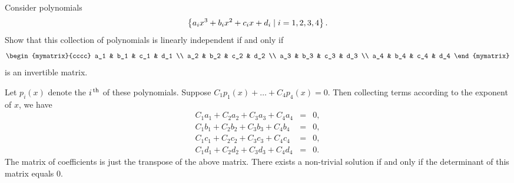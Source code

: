 \begin{ex}
  Consider polynomials
  \begin{equation*}
    \left\{a_ix^3+b_ix^2+c_ix+d_i \mid i=1,2,3,4\right\}.
  \end{equation*}
  Show that this collection of polynomials is linearly independent if
  and only if
  \begin{equation*}
    \begin{mymatrix}{cccc}
      a_1 & b_1 & c_1 & d_1 \\
      a_2 & b_2 & c_2 & d_2 \\
      a_3 & b_3 & c_3 & d_3 \\
      a_4 & b_4 & c_4 & d_4
    \end{mymatrix}
  \end{equation*}
  is an invertible matrix.
  \begin{sol}
    Let $p_i(x)$ denote the $i^{\,\rm th}$ of these polynomials. Suppose
    $C_1p_1(x) + \ldots + C_4p_4(x) = 0$. Then collecting terms
    according to the exponent of $x$, we have
    \begin{eqnarray*}
      C_1 a_1 + C_2 a_2 + C_3 a_3 + C_4 a_4 &=& 0, \\
      C_1 b_1 + C_2 b_2 + C_3 b_3 + C_4 b_4 &=& 0, \\
      C_1 c_1 + C_2 c_2 + C_3 c_3 + C_4 c_4 &=& 0, \\
      C_1 d_1 + C_2 d_2 + C_3 d_3 + C_4 d_4 &=& 0.
    \end{eqnarray*}
    The matrix of coefficients is just the transpose of the above
    matrix. There exists a non-trivial solution if and only if the
    determinant of this matrix equals 0.
  \end{sol}
\end{ex}

